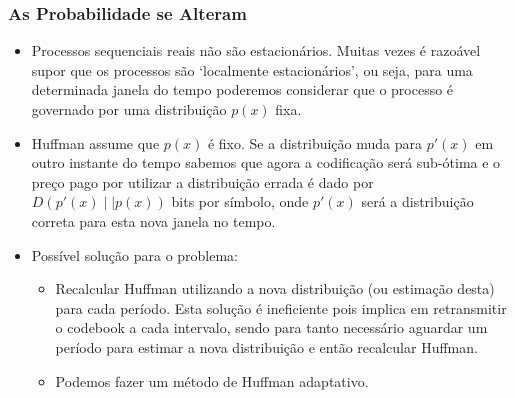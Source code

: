 \begin{frame}[allowframebreaks]
  \frametitle{As Probabilidade se Alteram}
  \begin{itemize}
  \item Processos sequenciais reais não são estacionários. Muitas vezes é razoável supor que os processos
	são `localmente estacionários', ou seja, para uma determinada janela do tempo poderemos considerar
	que o processo é governado por uma distribuição $p(x)$ fixa.
  \item Huffman assume que $p(x)$ é fixo. Se a distribuição muda para $p'(x)$ em outro instante do tempo
	sabemos que agora a codificação será sub-ótima e o preço pago por utilizar a distribuição errada
	é dado por $D(p'(x) \mid \mid p(x))$ bits por símbolo, onde $p'(x)$ será a distribuição correta
	para esta nova janela no tempo.
  \item Possível solução para o problema:
	\begin{itemize}
	\item Recalcular Huffman utilizando a nova distribuição (ou estimação desta) para cada período.
		Esta solução é ineficiente pois implica em retransmitir o codebook a cada intervalo,
		sendo para tanto necessário aguardar um período para estimar a nova distribuição e então 
		recalcular Huffman.
	\item Podemos fazer um método de Huffman adaptativo.
	\end{itemize} 
  \end{itemize}
\end{frame}


